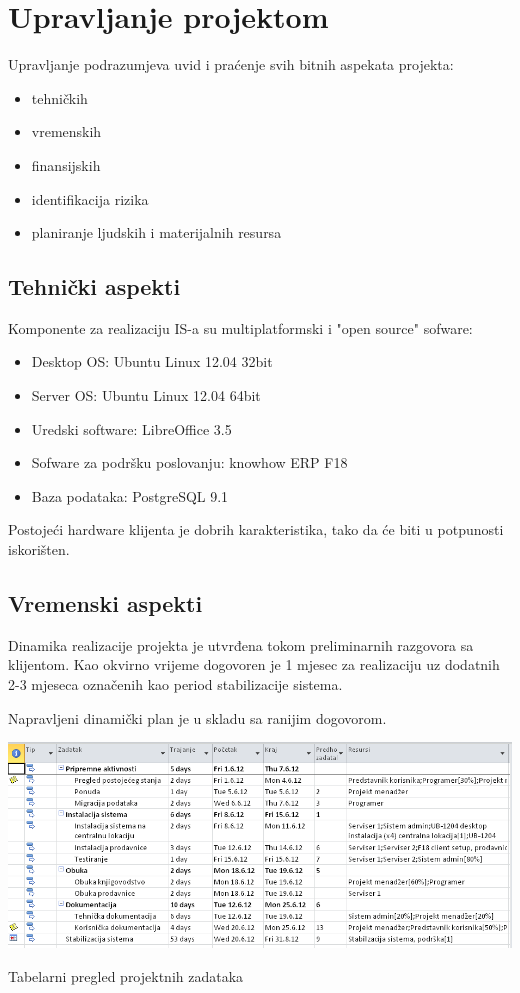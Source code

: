 \documentclass[times, utf8, seminar]{fit}
\begin{document}
\chapter{Upravljanje projektom}

Upravljanje podrazumjeva uvid i praćenje svih bitnih aspekata projekta:
\begin{itemize}
  \item tehničkih
  \item vremenskih
  \item finansijskih
  \item identifikacija rizika
  \item planiranje ljudskih i materijalnih resursa
\end{itemize}

\section{Tehnički aspekti}

Komponente za realizaciju IS-a su multiplatformski i "open source" sofware:
\begin{itemize}
  \item Desktop OS: Ubuntu Linux 12.04 32bit
  \item Server OS: Ubuntu Linux 12.04 64bit
  \item Uredski software: LibreOffice 3.5
  \item Sofware za podršku poslovanju: knowhow ERP F18
  \item Baza podataka: PostgreSQL 9.1
\end{itemize}

Postojeći hardware klijenta je dobrih karakteristika, tako da će biti u potpunosti iskorišten.
\pagebreak
\section{Vremenski aspekti}

Dinamika realizacije projekta je utvrđena tokom preliminarnih razgovora sa klijentom. Kao okvirno vrijeme dogovoren je 1 mjesec za realizaciju uz dodatnih 2-3 mjeseca označenih kao period stabilizacije sistema. 

Napravljeni dinamički plan je u skladu sa ranijim dogovorom.

\begin{table}[!h]
\centering
\includegraphics[width=15.5cm]{img/dinamika_sheet.png}
\caption{Tabelarni pregled projektnih zadataka}
\end{table}
\end{document}

